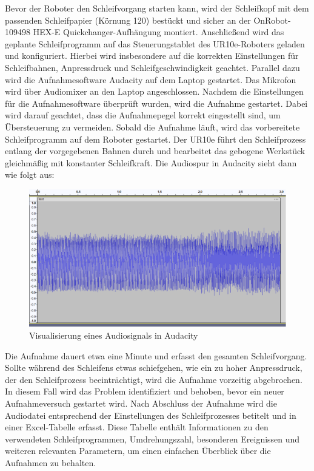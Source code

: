 Bevor der Roboter den Schleifvorgang starten kann, wird der Schleifkopf mit dem passenden Schleifpapier (Körnung 120) bestückt und sicher an der OnRobot-109498 HEX-E Quickchanger-Aufhängung montiert. Anschließend wird das geplante Schleifprogramm auf das Steuerungstablet des UR10e-Roboters geladen und konfiguriert. Hierbei wird insbesondere auf die korrekten Einstellungen für Schleifbahnen, Anpressdruck und Schleifgeschwindigkeit geachtet. Parallel dazu wird die Aufnahmesoftware Audacity auf dem Laptop gestartet. Das Mikrofon wird über Audiomixer an den Laptop angeschlossen. Nachdem die Einstellungen für die Aufnahmesoftware überprüft wurden, wird die Aufnahme gestartet. Dabei wird darauf geachtet, dass die Aufnahmepegel korrekt eingestellt sind, um Übersteuerung zu vermeiden. Sobald die Aufnahme läuft, wird das vorbereitete Schleifprogramm auf dem Roboter gestartet. Der UR10e führt den Schleifprozess entlang der vorgegebenen Bahnen durch und bearbeitet das gebogene Werkstück gleichmäßig mit konstanter Schleifkraft. Die Audiospur in Audacity sieht dann wie folgt aus:

\begin{figure}[H]
    \centering
    \includegraphics[width=0.7\linewidth]{images/audacity.png}
    \caption{Visualisierung eines Audiosignals in Audacity}
    \label{fig:enter-label}
\end{figure}

Die Aufnahme dauert etwa eine Minute und erfasst den gesamten Schleifvorgang. Sollte während des Schleifens etwas schiefgehen, wie ein zu hoher Anpressdruck, der den Schleifprozess beeinträchtigt, wird die Aufnahme vorzeitig abgebrochen. In diesem Fall wird das Problem identifiziert und behoben, bevor ein neuer Aufnahmeversuch gestartet wird. Nach Abschluss der Aufnahme wird die Audiodatei entsprechend der Einstellungen des Schleifprozesses betitelt und in einer Excel-Tabelle erfasst. Diese Tabelle enthält Informationen zu den verwendeten Schleifprogrammen, Umdrehungszahl, besonderen Ereignissen und weiteren relevanten Parametern, um einen einfachen Überblick über die Aufnahmen zu behalten.     

